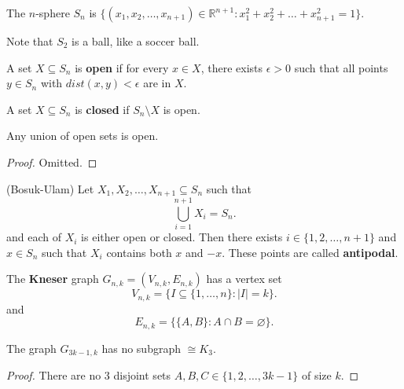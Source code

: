 
\begin{definition}
	The \( n \)-sphere \( S_n \) is \( \{(x_{1}, x_{2}, \ldots , x_{n+1})  \in \mathbb{R}^{n+1} : x_{1}^2+x_{2}^2+\ldots +x_{n+1}^2 = 1 \} \).
\end{definition}

Note that \( S_2 \) is a ball, like a soccer ball.

\begin{definition}
	A set \( X \subseteq S_n \) is \textbf{open} if for every \( x \in X \), there exists \( \epsilon >0 \) such that all points \( y \in S_n \) with \( dist(x, y) < \epsilon  \) are in \( X \).
\end{definition}

\begin{definition}
	A set \( X \subseteq S_{n} \) is \textbf{closed} if \( S_n \setminus X \) is open.
\end{definition}

\begin{lemma}
	Any union of open sets is open.
\end{lemma}
\begin{proof}
	Omitted.
\end{proof}

\begin{theorem}
	(Bosuk-Ulam) Let \( X_{1}, X_{2}, \ldots , X_{n+1} \subseteq S_n \) such that \[
		\bigcup_{i=1}^{n+1}X_i = S_n 
	.\] and each of \( X_i \) is either open or closed. Then there exists \( i \in \{1, 2, \ldots , n+1\}   \) and \( x \in S_n \) such that \( X_i \) contains both \( x  \) and \( -x \). These points are called \textbf{antipodal}.
\end{theorem}

\begin{definition}
	The \textbf{Kneser} graph \( G_{n,k} = (V_{n,k}, E_{n,k}) \) has a vertex set \[
		V_{n,k}= \{I \subseteq \{1, \ldots , n\} : |I| = k \}  
	.\]  and \[
		E_{n,k} = \{\{A,B\} : A\cap B = \varnothing \}  
	.\] 
\end{definition}

\begin{lemma}
	The graph \( G_{3k-1, k} \) has no subgraph \( \cong K_3 \).
\end{lemma}
\begin{proof}
	There are no 3 disjoint sets \( A, B, C \in \{1, 2, \ldots , 3k-1\}   \) of size \( k \).
\end{proof}

